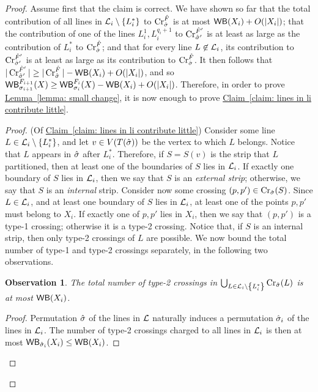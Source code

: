 \documentclass[11pt]{article}
\numberwithin{equation}{section}
\theoremstyle{definition}
\theoremstyle{plain}
\newcommand{\expref}[2]{\hyperref[#2]{#1~\ref{#2}}}
\newtheorem{myobs}[theorem]{Observation}
\begin{document}
\begin{proof}
	Assume first that the claim is correct. We have shown so far that the total contribution of all lines in ${\mathcal L}_i\setminus\left\{ L_i^* \right\}$ to $\operatorname{Cr}^{\hat F}_{\hat{\sigma}}$ is at most $\mathsf{WB}(X_i)+O(|X_i|)$; that the contribution of one of the lines $L_i^1,L_i^{q_i+1}$ to $\operatorname{Cr}^{\hat F'}_{\hat{\sigma}'}$ is at least as large as the contribution of $L_i^*$ to $\operatorname{Cr}^{\hat F}_{\hat{\sigma}}$; and that for every line $L\not\in {\mathcal L}_i$, its contribution to $\operatorname{Cr}^{\hat F'}_{\hat{\sigma}'}$ is at least as large as its contribution to $\operatorname{Cr}^{\hat F}_{\hat{\sigma}}$. It then follows that $|\operatorname{Cr}^{\hat F'}_{\hat{\sigma}'}|\geq |\operatorname{Cr}^{\hat F}_{\hat{\sigma}}|-\mathsf{WB}(X_i)+O(|X_i|)$, and so
	$\mathsf{WB}^{F_{i+1}}_{\sigma_{i+1}}(X)\geq \mathsf{WB}^{F_i}_{\sigma_i}(X)-\mathsf{WB}(X_i)+O(|X_i|)$. Therefore, in order to prove \expref{Lemma}{lemma: small change}, it is now enough to prove \expref{Claim}{claim: lines in li contribute little}.
	
	\begin{proof} (Of \expref{Claim}{claim: lines in li contribute little})
		Consider some line $L\in {\mathcal L}_i\setminus\left\{ L_i^* \right\}$, and let $v\in V(T({\hat{\sigma}}))$ be the vertex to which $L$ belongs. Notice that $L$ appears in $\hat{\sigma}$ after $L_i^*$. Therefore, if $S=S(v)$ is the strip that $L$ partitioned, then at least one of the boundaries of $S$ lies in ${\mathcal L}_i$. If exactly one boundary of $S$ lies in ${\mathcal L}_i$, then we say that $S$ is an \emph{external strip}; otherwise, we say that $S$ is an \emph{internal} strip. Consider now some crossing $(p,p')\in \operatorname{Cr}_{\hat{\sigma}}(S)$. Since $L\in {\mathcal L}_i$, and at least one boundary of $S$ lies in ${\mathcal L}_i$, at least one of the points $p,p'$ must belong to $X_i$. If exactly one of $p,p'$ lies in $X_i$, then we say that $(p,p')$ is a type-1 crossing; otherwise it is a type-2 crossing. Notice that, if $S$ is an internal strip, then only type-2 crossings of $L$ are possible. We now bound the total number of type-1 and type-2 crossings separately, in the following two observations.
		
		
		\begin{myobs}\label{obs: type 2 crossings}
			The total number of type-2 crossings in $\bigcup_{L\in {\mathcal L}_i\setminus\left\{ L_i^* \right\}}\operatorname{Cr}_{\hat{\sigma}}(L)$ is at most $\mathsf{WB}(X_i)$.
		\end{myobs}
		
		\begin{proof}
			Permutation $\hat{\sigma}$ of the lines in ${\mathcal L}$ naturally induces a permutation $\hat{\sigma}_i$ of the lines in ${\mathcal L}_i$. The number of type-2 crossings charged to all lines in ${\mathcal L}_i$ is then at most $\mathsf{WB}_{\hat{\sigma}_i}(X_i)\leq \mathsf{WB}(X_i)$.%
		\end{proof}
		

\end{proof}
\end{proof}
\end{document}
